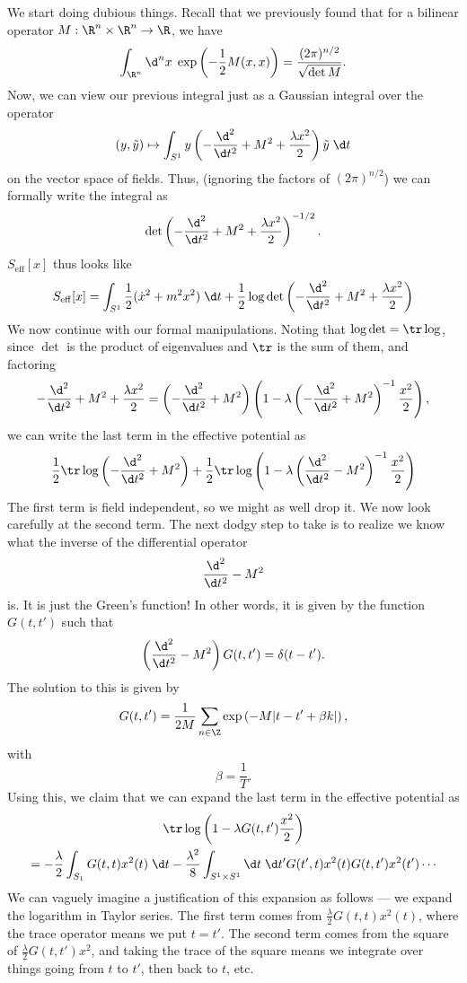 \documentclass[a4paper]{article}
\begin{document}
We start doing dubious things. Recall that we previously found that for a bilinear operator $M: \R^n \times \R^n \to \R$, we have
\[
  \int_{\R^n} \d^n x\; \exp\left(- \frac{1}{2} M(x, x)\right) = \frac{(2 \pi)^{n/2}}{\sqrt{\det{M}}}.
\]
Now, we can view our previous integral just as a Gaussian integral over the operator
\[
  (y, \tilde{y}) \mapsto \int_{S^1} y\left(-\frac{\d^2}{\d t^2} + M^2 + \frac{\lambda x^2}{2}\right) \tilde{y} \;\d t
\]
on the vector space of fields. Thus, (ignoring the factors of $(2\pi)^{n/2}$) we can formally write the integral as
\[
  \det \left(-\frac{\d^2}{\d t^2} + M^2 + \frac{\lambda x^2}{2}\right)^{-1/2}.
\]
$S_{\mathrm{eff}}[x]$ thus looks like
\[
  S_{\mathrm{eff}}[x] = \int_{S^1} \frac{1}{2}(\dot{x}^2 + m^2 x^2) \;\d t + \frac{1}{2} \log \det \left(-\frac{\d^2}{\d t^2} + M^2 + \frac{\lambda x^2}{2}\right)
\]
We now continue with our formal manipulations. Noting that $\log \det = \tr \log$, since $\det$ is the product of eigenvalues and $\tr$ is the sum of them, and factoring
\[
  -\frac{\d^2}{\d t^2} + M^2 + \frac{\lambda x^2}{2} = \left(-\frac{\d^2}{\d t^2} + M^2\right)\left(1 - \lambda \left(-\frac{\d^2}{\d t^2} + M^2\right)^{-1} \frac{x^2}{2}\right),
\]
we can write the last term in the effective potential as
\[
 \frac{1}{2} \tr \log \left(-\frac{\d^2}{\d t^2} + M^2\right) + \frac{1}{2} \tr \log \left(1 - \lambda \left(\frac{\d^2}{\d t^2} - M^2\right)^{-1} \frac{x^2}{2}\right)
\]
The first term is field independent, so we might as well drop it. We now look carefully at the second term. The next dodgy step to take is to realize we know what the inverse of the differential operator
\[
  \frac{\d^2}{\d t^2} - M^2
\]
is. It is just the Green's function! In other words, it is given by the function $G(t, t')$ such that
\[
  \left(\frac{\d^2}{\d t^2} - M^2 \right) G(t, t') = \delta(t - t').
\]
The solution to this is given by
\[
  G(t, t') = \frac{1}{2M} \sum_{n \in \Z} \exp\left(-M |t - t' + \beta k|\right),
\]
with
\[
  \beta = \frac{1}{T}.
\]
Using this, we claim that we can expand the last term in the effective potential as
\begin{multline*}
  \tr \log \left(1 - \lambda G(t, t') \frac{x^2}{2}\right) \\
  = - \frac{\lambda}{2} \int_{S_1}G(t, t) x^2(t) \;\d t - \frac{\lambda^2}{8} \int_{S^1 \times S^1} \d t\; \d t' G(t', t) x^2(t) G(t, t') x^2(t') \cdots
\end{multline*}
We can vaguely imagine a justification of this expansion as follows --- we expand the logarithm in Taylor series. The first term comes from $\frac{\lambda}{2}G(t, t) x^2(t)$, where the trace operator means we put $t = t'$. The second term comes from the square of $\frac{\lambda}{2} G(t, t') x^2$, and taking the trace of the square means we integrate over things going from $t$ to $t'$, then back to $t$, etc.
\end{document}
